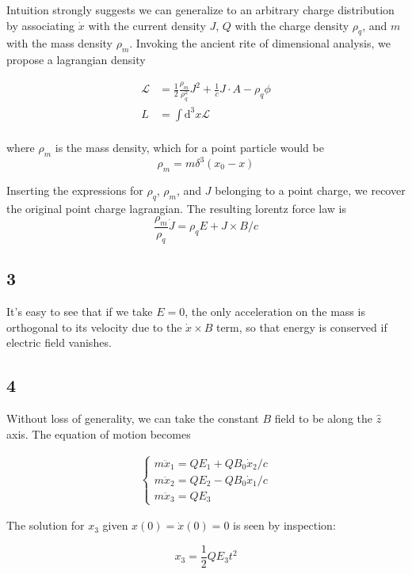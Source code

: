 \documentclass[12pt]{article}
\begin{document}
Intuition strongly suggests we can generalize to an arbitrary charge distribution by associating \(\dot{x}\) with the current density \(J\), \(Q\) with the charge density \(\rho_q\), and \(m\) with the mass density \(\rho_m\). Invoking the ancient rite of dimensional analysis, we propose a lagrangian density

\begin{align*}
\mathscr{L} &= \frac{1}{2}\frac{\rho_m}{\rho_q^2}J^2  +\frac{1}{c}J\cdot A - \rho_q \phi\\
L &= \int \mathrm{d}^3x \mathscr{L} \\
\end{align*}

where \(\rho_m\) is the mass density, which for a point particle would be
\[ \rho_m = m\delta^3(x_0 - x)
\]

Inserting the expressions for \(\rho_q\), \(\rho_m\), and \(J\) belonging to a point charge, we recover the original point charge lagrangian. The resulting lorentz force law is
\[ \frac{\rho_m}{\rho_q}\dot{J} = \rho_qE + J \times B/c
\]

\subsection*{3}

It's easy to see that if we take \(E=0\), the only acceleration on the mass is orthogonal to its velocity due to the \(\dot{x}\times B\) term, so that energy is conserved if electric field vanishes.

\subsection*{4}

Without loss of generality, we can take the constant \(B\) field to be along the \(\hat{z}\) axis. The equation of motion becomes

\begin{align*}
\begin{cases}
m\ddot{x}_1 = QE_1 + QB_0\dot{x}_2/c \\
m\ddot{x}_2 = QE_2 - QB_0\dot{x}_1/c \\
m\ddot{x}_3 = QE_3
\end{cases}
\end{align*}

The solution for \(x_3\) given \(x(0)=\dot{x}(0) =0\) is seen by inspection:

\[x_3 = \frac{1}{2}QE_3t^2
\]
\end{document}
